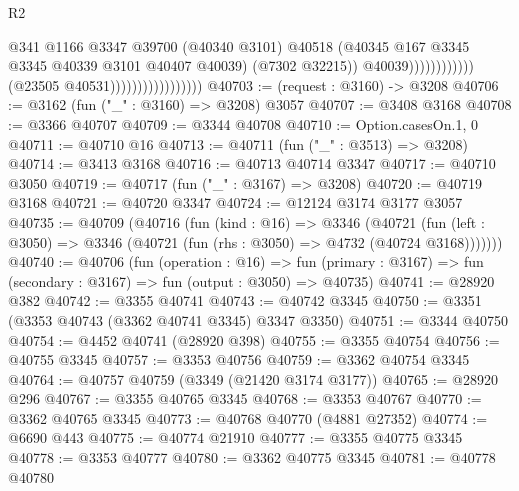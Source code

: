 \begin{lexlean}{R2}
\begin{coremodule}
                                                              @341
                                                              @1166
                                                              @3347
                                                              @39700
                                                              (@40340 @3101)
                                                              @40518
                                                              (@40345
                                                                @167
                                                                @3345
                                                                @3345
                                                                @40339
                                                                @3101
                                                                @40407
                                                                @40039)
                                                              (@7302 @32215))
                                                            @40039))))))))))))
                                    (@23505 @40531)))))))))))))))))
@40703 := (request : @3160) -> @3208
@40706 := @3162 (fun ("_" : @3160) => @3208) @3057
@40707 := @3408 @3168
@40708 := @3366 @40707
@40709 := @3344 @40708
@40710 := Option.casesOn.{1, 0}
@40711 := @40710 @16
@40713 := @40711 (fun ("_" : @3513) => @3208)
@40714 := @3413 @3168
@40716 := @40713 @40714 @3347
@40717 := @40710 @3050
@40719 := @40717 (fun ("_" : @3167) => @3208)
@40720 := @40719 @3168
@40721 := @40720 @3347
@40724 := @12124 @3174 @3177 @3057
@40735 := @40709
    (@40716
      (fun (kind : @16) =>
      @3346
        (@40721
          (fun (left : @3050) => @3346 (@40721 (fun (rhs : @3050) => @4732 (@40724 @3168)))))))
@40740 := @40706
    (fun (operation : @16) =>
    fun (primary : @3167) => fun (secondary : @3167) => fun (output : @3050) => @40735)
@40741 := @28920 @382
@40742 := @3355 @40741
@40743 := @40742 @3345
@40750 := @3351 (@3353 @40743 (@3362 @40741 @3345) @3347 @3350)
@40751 := @3344 @40750
@40754 := @4452 @40741 (@28920 @398)
@40755 := @3355 @40754
@40756 := @40755 @3345
@40757 := @3353 @40756
@40759 := @3362 @40754 @3345
@40764 := @40757 @40759 (@3349 (@21420 @3174 @3177))
@40765 := @28920 @296
@40767 := @3355 @40765 @3345
@40768 := @3353 @40767
@40770 := @3362 @40765 @3345
@40773 := @40768 @40770 (@4881 @27352)
@40774 := @6690 @443
@40775 := @40774 @21910
@40777 := @3355 @40775 @3345
@40778 := @3353 @40777
@40780 := @3362 @40775 @3345
@40781 := @40778 @40780

\end{coremodule}
\end{lexlean}

